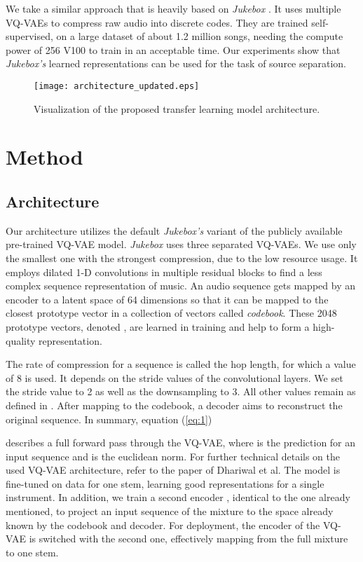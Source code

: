 \documentclass{llncs}
\begin{document}
We take a similar approach that is heavily based on \textit{Jukebox} \cite{dhariwal2020jukebox}. It uses multiple VQ-VAEs to compress raw audio into discrete codes. They are trained self-supervised, on a large dataset of about 1.2 million songs, needing the compute power of 256 V100 to train in an acceptable time. Our experiments show that \textit{Jukebox's} learned representations can be used for the task of source separation.

\begin{figure*}[ht]
 \centering
 \texttt{[image: architecture\_updated.eps]}
 \caption{Visualization of the proposed transfer learning model architecture.}
 \label{fig:fig1}
\end{figure*}


\section{Method}
\subsection{Architecture}

Our architecture utilizes the default \textit{Jukebox's} \cite{dhariwal2020jukebox} variant of the publicly available pre-trained VQ-VAE model. \textit{Jukebox} uses three separated VQ-VAEs. We use only the smallest one with the strongest compression, due to the low resource usage. It employs dilated 1-D convolutions in multiple residual blocks to find a less complex sequence representation of music. An audio sequence  gets mapped by an encoder  to a latent space  of 64 dimensions so that it can be mapped to the closest prototype vector in a collection  of vectors called \textit{codebook}. These 2048 prototype vectors, denoted , are learned in training and help to form a high-quality representation.

The rate of compression for a sequence is called the hop length, for which a value of 8 is used. It depends on the stride values of the convolutional layers. We set the stride value to 2 as well as the downsampling to 3. All other values remain as defined in \cite{dhariwal2020jukebox}. After mapping to the codebook, a decoder  aims to reconstruct the original sequence. In summary, equation (\ref{eq:1})

 

describes a full forward pass through the VQ-VAE, where  is the prediction for an input sequence  and  is the euclidean norm. For further technical details on the used VQ-VAE architecture, refer to the paper of Dhariwal et al\cite{dhariwal2020jukebox}. The model is fine-tuned on data for one stem, learning good representations for a single instrument. In addition, we train a second encoder , identical to the one already mentioned, to project an input sequence of the mixture to the space already known by the codebook and decoder. For deployment, the encoder of the VQ-VAE is switched with the second one, effectively mapping from the full mixture to one stem.
\end{document}
